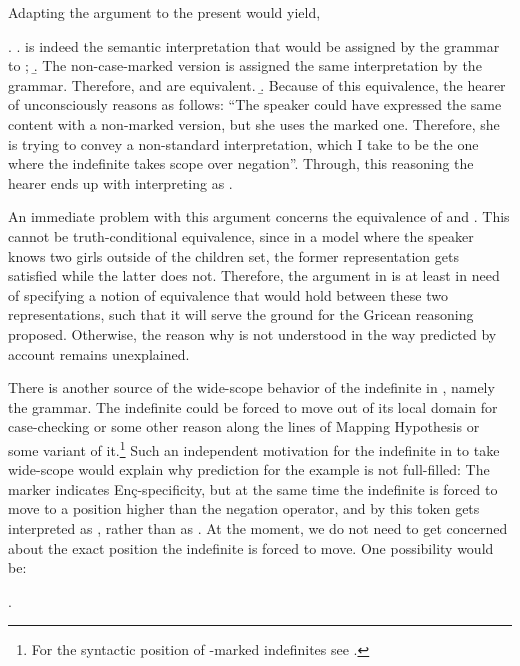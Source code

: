 \documentclass[11pt,a4paper]{article}
\newcommand{\encspec}{Enç-specific}
\begin{document}
Adapting the argument to the present would yield,

\ex.\label{encgrice}
\a.  is indeed the semantic interpretation that would be assigned by the grammar to ;
\b. The non-case-marked version is assigned the same interpretation by the grammar. Therefore,   and  are equivalent.
\b. Because of this equivalence, the hearer of  unconsciously reasons as follows: ``The speaker could have expressed the same content with a non-marked version, but she uses the marked one. Therefore, she is trying to convey a non-standard interpretation, which I take to be the one where the indefinite takes scope over negation''. Through, this reasoning the hearer ends up with interpreting  as .


An immediate problem with this argument concerns the equivalence of
 and . This cannot be
truth-conditional equivalence, since in a model where the speaker knows two
girls outside of the children set, the former representation gets satisfied
while the latter does not. Therefore, the argument in  is at
least in need of specifying a notion of equivalence that would hold between
these two representations, such that it will serve the ground for the Gricean
reasoning proposed. Otherwise, the reason why  is not
understood in the way predicted by  account remains unexplained.

There is another source of the wide-scope behavior of the indefinite
in , namely the grammar. The indefinite could be
forced to move out of its local domain for case-checking or some other
reason along the lines of  Mapping Hypothesis or some
variant of it.\footnote{For the syntactic position of \acc-marked
indefinites see .} Such an
independent motivation for the indefinite in  to
take wide-scope would explain why  prediction for the
example is not full-filled: The marker indicates \encspec ity, but at
the same time the indefinite is forced to move to a position higher
than the negation operator, and by this token  gets
interpreted as , rather than as .
At the moment, we do not need to get concerned about the exact
position the indefinite is forced to move. One possibility would be:

\ex.
\end{document}
